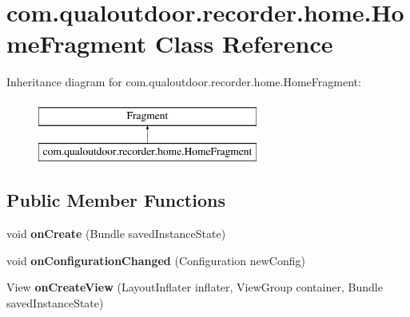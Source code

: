 \hypertarget{classcom_1_1qualoutdoor_1_1recorder_1_1home_1_1HomeFragment}{\section{com.\-qualoutdoor.\-recorder.\-home.\-Home\-Fragment Class Reference}
\label{classcom_1_1qualoutdoor_1_1recorder_1_1home_1_1HomeFragment}
}
Inheritance diagram for com.\-qualoutdoor.\-recorder.\-home.\-Home\-Fragment\-:\begin{figure}[H]
\begin{center}
\leavevmode
\includegraphics[height=2.000000cm]{classcom_1_1qualoutdoor_1_1recorder_1_1home_1_1HomeFragment}
\end{center}
\end{figure}
\subsection*{Public Member Functions}
\begin{DoxyCompactItemize}
\item 
\hypertarget{classcom_1_1qualoutdoor_1_1recorder_1_1home_1_1HomeFragment_a6a5c90a49bceb2777cd6d105688ef3a9}{void {\bfseries on\-Create} (Bundle saved\-Instance\-State)}\label{classcom_1_1qualoutdoor_1_1recorder_1_1home_1_1HomeFragment_a6a5c90a49bceb2777cd6d105688ef3a9}

\item 
\hypertarget{classcom_1_1qualoutdoor_1_1recorder_1_1home_1_1HomeFragment_af6f429e139b81b06a875fd1aa735df7a}{void {\bfseries on\-Configuration\-Changed} (Configuration new\-Config)}\label{classcom_1_1qualoutdoor_1_1recorder_1_1home_1_1HomeFragment_af6f429e139b81b06a875fd1aa735df7a}

\item 
\hypertarget{classcom_1_1qualoutdoor_1_1recorder_1_1home_1_1HomeFragment_abf0973c6379abda4ad291be323697dec}{View {\bfseries on\-Create\-View} (Layout\-Inflater inflater, View\-Group container, Bundle saved\-Instance\-State)}\label{classcom_1_1qualoutdoor_1_1recorder_1_1home_1_1HomeFragment_abf0973c6379abda4ad291be323697dec}

\end{DoxyCompactItemize}
